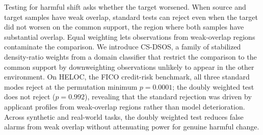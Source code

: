 Testing for harmful shift asks whether the target worsened. When source and target samples have weak overlap, standard tests can reject even when the target did not worsen on the common support, the region where both samples have substantial overlap. Equal weighting lets observations from weak-overlap regions contaminate the comparison. We introduce CS-DSOS, a family of stabilized density-ratio weights from a domain classifier that restrict the comparison to the common support by downweighting observations unlikely to appear in the other environment. On HELOC, the FICO credit-risk benchmark, all three standard modes reject at the permutation minimum $p = 0.0001$; the doubly weighted test does not reject ($p = 0.992$), revealing that the standard rejection was driven by applicant profiles from weak-overlap regions rather than model deterioration. Across synthetic and real-world tasks, the doubly weighted test reduces false alarms from weak overlap without attenuating power for genuine harmful change.
